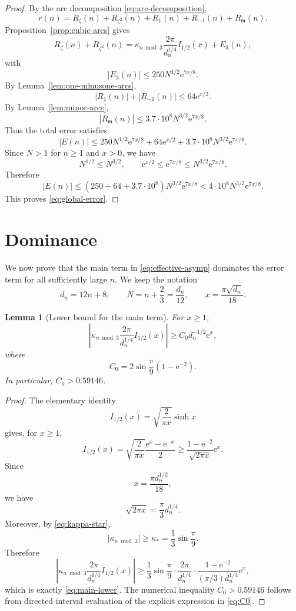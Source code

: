 \documentclass[10pt,a4paper]{amsart}
\newtheorem{lemma}[theorem]{Lemma}
\newcommand{\e}{\mathrm e}
\newcommand{\mm}{\mathfrak m}
\begin{document}
\begin{proof}
By the arc decomposition \eqref{eq:arc-decomposition},
\[
r(n)
=
R_\zeta(n)+R_{\zeta^2}(n)
+
R_1(n)+R_{-1}(n)+R_{\mm}(n).
\]
Proposition~\ref{prop:cubic-arcs} gives
\[
R_\zeta(n)+R_{\zeta^2}(n)
=
\kappa_{n\bmod3}
\frac{2\pi}{d_n^{1/4}}I_{1/2}(x)
+
E_3(n),
\]
with
\[
|E_3(n)|\leq250N^{1/2}\e^{7x/8}.
\]
By Lemma~\ref{lem:one-minusone-arcs},
\[
|R_1(n)|+|R_{-1}(n)|
\leq64\e^{x/2}.
\]
By Lemma~\ref{lem:minor-arcs},
\[
|R_{\mm}(n)|
\leq
3.7\cdot10^8N^{3/2}\e^{7x/8}.
\]
Thus the total error satisfies
\[
|E(n)|
\leq
250N^{1/2}\e^{7x/8}
+
64\e^{x/2}
+
3.7\cdot10^8N^{3/2}\e^{7x/8}.
\]
Since $N>1$ for $n\geq1$ and $x>0$, we have
\[
N^{1/2}\leq N^{3/2},
\qquad
\e^{x/2}\leq \e^{7x/8}\leq N^{3/2}\e^{7x/8}.
\]
Therefore
\[
|E(n)|
\leq
\left(250+64+3.7\cdot10^8\right)
N^{3/2}\e^{7x/8}
<
4\cdot10^8N^{3/2}\e^{7x/8}.
\]
This proves \eqref{eq:global-error}.
\end{proof}


\section{Dominance}\label{sec:dominance}

We now prove that the main term in \eqref{eq:effective-asymp} dominates the
error term for all sufficiently large $n$.  We keep the notation
\[
d_n=12n+8,
\qquad
N=n+\frac23=\frac{d_n}{12},
\qquad
x=\frac{\pi\sqrt{d_n}}{18}.
\]

\begin{lemma}[Lower bound for the main term]\label{lem:main-lower}
For $x\geq1$,
\begin{equation}\label{eq:main-lower}
\left|\kappa_{n\bmod3}\frac{2\pi}{d_n^{1/4}}I_{1/2}(x)\right|
\geq C_0d_n^{-1/2}\e^x,
\end{equation}
where
\begin{equation}\label{eq:C0}
C_0=2\sin\frac\pi9(1-\e^{-2}).
\end{equation}
In particular, $C_0>0.59146$.
\end{lemma}

\begin{proof}
The elementary identity
\[
I_{1/2}(x)=\sqrt{\frac{2}{\pi x}}\sinh x
\]
gives, for $x\geq1$,
\[
I_{1/2}(x)
=\sqrt{\frac{2}{\pi x}}\frac{\e^x-\e^{-x}}{2}
\geq
\frac{1-\e^{-2}}{\sqrt{2\pi x}}\e^x.
\]
Since
\[
x=\frac{\pi d_n^{1/2}}{18},
\]
we have
\[
\sqrt{2\pi x}=\frac{\pi}{3}d_n^{1/4}.
\]
Moreover, by \eqref{eq:kappa-star},
\[
|\kappa_{n\bmod3}|\geq\kappa_*=\frac13\sin\frac\pi9.
\]
Therefore
\[
\left|\kappa_{n\bmod3}\frac{2\pi}{d_n^{1/4}}I_{1/2}(x)\right|
\geq
\frac13\sin\frac\pi9\cdot
\frac{2\pi}{d_n^{1/4}}\cdot
\frac{1-\e^{-2}}{(\pi/3)d_n^{1/4}}\e^x,
\]
which is exactly \eqref{eq:main-lower}.
The numerical inequality $C_0>0.59146$ follows from directed interval
evaluation of the explicit expression in \eqref{eq:C0}.
\end{proof}
\end{document}
